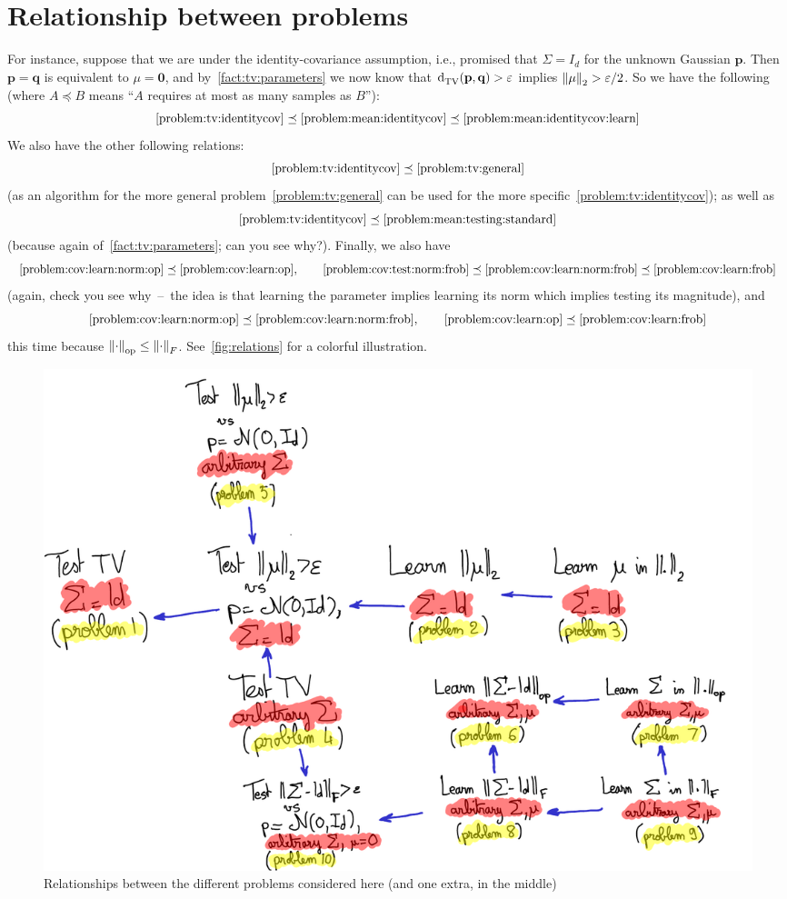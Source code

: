 \documentclass[10pt]{article}
\newcommand{\dst}{\varepsilon}
\newcommand{\dims}{d}
\newcommand{\p}{\mathbf{p}}
\newcommand{\q}{\mathbf{q}}
\theoremstyle{plain}
\begin{document}
\section{Relationship between problems}
For instance, suppose that we are under the identity-covariance assumption, i.e., promised that $\Sigma=I_\dims$ for the unknown Gaussian $\p$. Then $\p=\q$ is equivalent to $\mu=\mathbf{0}$, and by~\autoref{fact:tv:parameters} we now know that $\totalvardist{\p}{\q}>\dst$ implies $\normtwo{\mu}>\dst/2$. So we have the following (where $A \preceq B$ means ``$A$ requires at most as many samples as $B$''):
\[
      \text{\autoref{problem:tv:identitycov}} \preceq \text{\autoref{problem:mean:identitycov}} \preceq \text{\autoref{problem:mean:identitycov:learn}}
\]
We also have the other following relations:
\[
      \text{\autoref{problem:tv:identitycov}} \preceq \text{\autoref{problem:tv:general}}
\]
(as an algorithm for the more general problem~\autoref{problem:tv:general} can be used for the more specific~\autoref{problem:tv:identitycov}); as well as
\[
      \text{\autoref{problem:tv:identitycov}} \preceq \text{\autoref{problem:mean:testing:standard}}
\]
(because again of~\autoref{fact:tv:parameters}; can you see why?). Finally, we also have
\[
    \text{\autoref{problem:cov:learn:norm:op}} \preceq \text{\autoref{problem:cov:learn:op}}, \qquad \text{\autoref{problem:cov:test:norm:frob}} \preceq \text{\autoref{problem:cov:learn:norm:frob}} \preceq \text{\autoref{problem:cov:learn:frob}}
\]
(again, check you see why~--~the idea is that learning the parameter implies learning its norm which implies testing its magnitude), and
\[
    \text{\autoref{problem:cov:learn:norm:op}} \preceq \text{\autoref{problem:cov:learn:norm:frob}}, \qquad \text{\autoref{problem:cov:learn:op}} \preceq \text{\autoref{problem:cov:learn:frob}}
\]
this time because $\lVert\cdot{\rVert}_{\rm op}\leq \lVert\cdot{\rVert}_{F}$. See~\autoref{fig:relations} for a colorful illustration.

\begin{figure}\centering
  \includegraphics[width=.95\textwidth]{testing-gaussian-fig}
  \caption{\label{fig:relations}Relationships between the different problems considered here (and one extra, in the middle)}
\end{figure}
\end{document}
